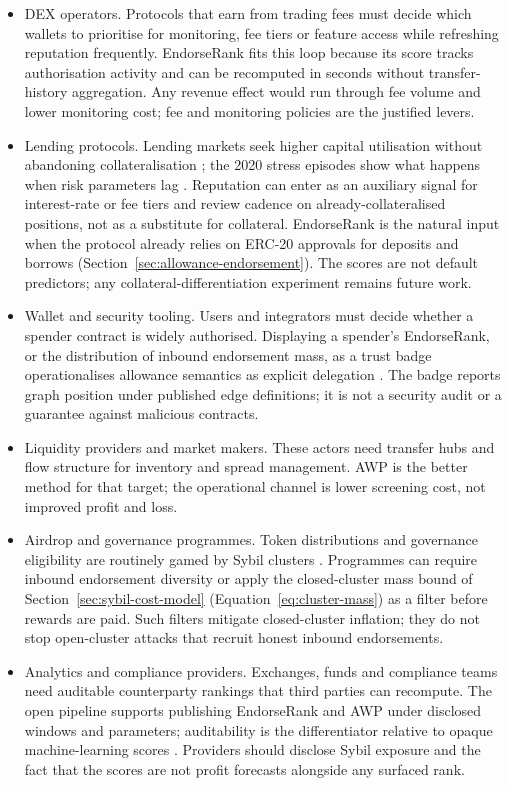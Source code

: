 \begin{itemize}
\item DEX operators. Protocols that earn from trading fees must decide which wallets to prioritise for monitoring, fee tiers or feature access while refreshing reputation frequently. EndorseRank fits this loop because its score tracks authorisation activity and can be recomputed in seconds without transfer-history aggregation. Any revenue effect would run through fee volume and lower monitoring cost; fee and monitoring policies are the justified levers.
\item Lending protocols. Lending markets seek higher capital utilisation without abandoning collateralisation ; the 2020 stress episodes show what happens when risk parameters lag . Reputation can enter as an auxiliary signal for interest-rate or fee tiers and review cadence on already-collateralised positions, not as a substitute for collateral. EndorseRank is the natural input when the protocol already relies on ERC-20 approvals for deposits and borrows (Section~\ref{sec:allowance-endorsement}). The scores are not default predictors; any collateral-differentiation experiment remains future work.
\item Wallet and security tooling. Users and integrators must decide whether a spender contract is widely authorised. Displaying a spender's EndorseRank, or the distribution of inbound endorsement mass, as a trust badge operationalises allowance semantics as explicit delegation . The badge reports graph position under published edge definitions; it is not a security audit or a guarantee against malicious contracts.
\item Liquidity providers and market makers. These actors need transfer hubs and flow structure for inventory and spread management. AWP is the better method for that target; the operational channel is lower screening cost, not improved profit and loss.
\item Airdrop and governance programmes. Token distributions and governance eligibility are routinely gamed by Sybil clusters . Programmes can require inbound endorsement diversity or apply the closed-cluster mass bound of Section~\ref{sec:sybil-cost-model} (Equation~\ref{eq:cluster-mass}) as a filter before rewards are paid. Such filters mitigate closed-cluster inflation; they do not stop open-cluster attacks that recruit honest inbound endorsements.
\item Analytics and compliance providers. Exchanges, funds and compliance teams need auditable counterparty rankings that third parties can recompute. The open pipeline supports publishing EndorseRank and AWP under disclosed windows and parameters; auditability is the differentiator relative to opaque machine-learning scores . Providers should disclose Sybil exposure and the fact that the scores are not profit forecasts alongside any surfaced rank.
\end{itemize}

